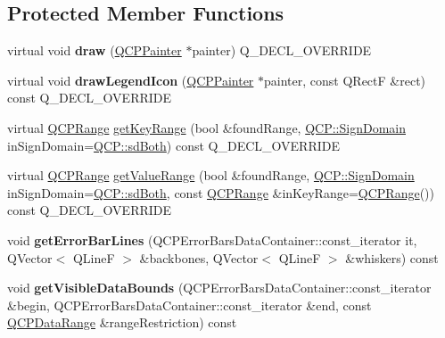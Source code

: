 \subsection*{Protected Member Functions}
\begin{DoxyCompactItemize}
\item 
\mbox{\label{classQCPErrorBars_a801e85931372abf2a1034bfb2eac5cd2}} 
virtual void {\bfseries draw} (\hyperlink{classQCPPainter}{Q\+C\+P\+Painter} $\ast$painter) Q\+\_\+\+D\+E\+C\+L\+\_\+\+O\+V\+E\+R\+R\+I\+DE
\item 
\mbox{\label{classQCPErrorBars_a20f5d292e66103f26bca00b11ce417b4}} 
virtual void {\bfseries draw\+Legend\+Icon} (\hyperlink{classQCPPainter}{Q\+C\+P\+Painter} $\ast$painter, const Q\+RectF \&rect) const Q\+\_\+\+D\+E\+C\+L\+\_\+\+O\+V\+E\+R\+R\+I\+DE
\item 
virtual \hyperlink{classQCPRange}{Q\+C\+P\+Range} \hyperlink{classQCPErrorBars_a6cac828a430d66ac77a167549d01d212}{get\+Key\+Range} (bool \&found\+Range, \hyperlink{namespaceQCP_afd50e7cf431af385614987d8553ff8a9}{Q\+C\+P\+::\+Sign\+Domain} in\+Sign\+Domain=\hyperlink{namespaceQCP_afd50e7cf431af385614987d8553ff8a9aa38352ef02d51ddfa4399d9551566e24}{Q\+C\+P\+::sd\+Both}) const Q\+\_\+\+D\+E\+C\+L\+\_\+\+O\+V\+E\+R\+R\+I\+DE
\item 
virtual \hyperlink{classQCPRange}{Q\+C\+P\+Range} \hyperlink{classQCPErrorBars_ab76215a186ae4862235821e028685f26}{get\+Value\+Range} (bool \&found\+Range, \hyperlink{namespaceQCP_afd50e7cf431af385614987d8553ff8a9}{Q\+C\+P\+::\+Sign\+Domain} in\+Sign\+Domain=\hyperlink{namespaceQCP_afd50e7cf431af385614987d8553ff8a9aa38352ef02d51ddfa4399d9551566e24}{Q\+C\+P\+::sd\+Both}, const \hyperlink{classQCPRange}{Q\+C\+P\+Range} \&in\+Key\+Range=\hyperlink{classQCPRange}{Q\+C\+P\+Range}()) const Q\+\_\+\+D\+E\+C\+L\+\_\+\+O\+V\+E\+R\+R\+I\+DE
\item 
\mbox{\label{classQCPErrorBars_abeea5ff0d66732bbfc9b74869d8c552e}} 
void {\bfseries get\+Error\+Bar\+Lines} (Q\+C\+P\+Error\+Bars\+Data\+Container\+::const\+\_\+iterator it, Q\+Vector$<$ Q\+LineF $>$ \&backbones, Q\+Vector$<$ Q\+LineF $>$ \&whiskers) const
\item 
\mbox{\label{classQCPErrorBars_aac9ffa98815035d300b2e9a67495ba4c}} 
void {\bfseries get\+Visible\+Data\+Bounds} (Q\+C\+P\+Error\+Bars\+Data\+Container\+::const\+\_\+iterator \&begin, Q\+C\+P\+Error\+Bars\+Data\+Container\+::const\+\_\+iterator \&end, const \hyperlink{classQCPDataRange}{Q\+C\+P\+Data\+Range} \&range\+Restriction) const

\end{DoxyCompactItemize}

